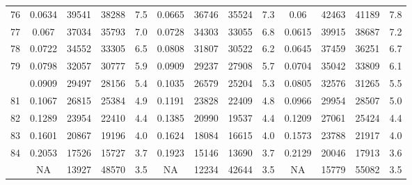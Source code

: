 \documentclass[
  14pt,
]{article}
\begin{document}
\begin{longtable}[t]{lcccccccccccc}
76 & 0.0634 & 39541 & 38288 & 7.5 & 0.0665 & 36746 & 35524 & 7.3 & 0.06 & 42463 & 41189 & 7.8\\
77 & 0.067 & 37034 & 35793 & 7.0 & 0.0728 & 34303 & 33055 & 6.8 & 0.0615 & 39915 & 38687 & 7.2\\
78 & 0.0722 & 34552 & 33305 & 6.5 & 0.0808 & 31807 & 30522 & 6.2 & 0.0645 & 37459 & 36251 & 6.7\\
79 & 0.0798 & 32057 & 30777 & 5.9 & 0.0909 & 29237 & 27908 & 5.7 & 0.0704 & 35042 & 33809 & 6.1\\
\addlinespace
80 & 0.0909 & 29497 & 28156 & 5.4 & 0.1035 & 26579 & 25204 & 5.3 & 0.0805 & 32576 & 31265 & 5.5\\
81 & 0.1067 & 26815 & 25384 & 4.9 & 0.1191 & 23828 & 22409 & 4.8 & 0.0966 & 29954 & 28507 & 5.0\\
82 & 0.1289 & 23954 & 22410 & 4.4 & 0.1385 & 20990 & 19537 & 4.4 & 0.1209 & 27061 & 25424 & 4.4\\
83 & 0.1601 & 20867 & 19196 & 4.0 & 0.1624 & 18084 & 16615 & 4.0 & 0.1573 & 23788 & 21917 & 4.0\\
84 & 0.2053 & 17526 & 15727 & 3.7 & 0.1923 & 15146 & 13690 & 3.7 & 0.2129 & 20046 & 17913 & 3.6\\
\addlinespace
85 & NA & 13927 & 48570 & 3.5 & NA & 12234 & 42644 & 3.5 & NA & 15779 & 55082 & 3.5\\*
\end{longtable}
\end{document}
